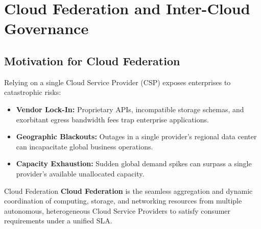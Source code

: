 \documentclass[11pt,a4paper,openany]{report}
\begin{document}
\section{Cloud Federation and Inter-Cloud Governance}
\subsection{Motivation for Cloud Federation}
Relying on a single Cloud Service Provider (CSP) exposes enterprises to catastrophic risks:
\begin{itemize}[leftmargin=*]
  \item \textbf{Vendor Lock-In:} Proprietary APIs, incompatible storage schemas, and exorbitant egress bandwidth fees trap enterprise applications.
  \item \textbf{Geographic Blackouts:} Outages in a single provider's regional data center can incapacitate global business operations.
  \item \textbf{Capacity Exhaustion:} Sudden global demand spikes can surpass a single provider's available unallocated capacity.
\end{itemize}

\begin{defbox}{Cloud Federation}
\textbf{Cloud Federation} is the seamless aggregation and dynamic coordination of computing, storage, and networking resources from multiple autonomous, heterogeneous Cloud Service Providers to satisfy consumer requirements under a unified SLA.
\end{defbox}
\end{document}
